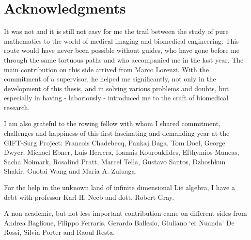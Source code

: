 
\qquad
\pagestyle{empty}
\newpage

\section*{Acknowledgments}
%


It was not and it is still not easy for me the trail between the study of pure mathematics to the world of medical imaging and biomedical engineering. This route would have never been possible without guides, who have gone before me through the same tortuous paths and who accompanied me in the last year. The main contribution on this side arrived from Marco Lorenzi. With the commitment of a supervisor, he helped me significantly, not only in the development of this thesis, and in solving various problems and doubts, but especially in having - laboriously - introduced me to the craft of biomedical research.

I am also grateful to the rowing fellow with whom I shared commitment, challenges and happiness of this first fascinating and demanding year at the GIFT-Surg Project: 
Francois Chadebecq, 
Pankaj Daga, 
Tom Doel, 
George Dwyer,
Michael Ebner,
Luis Herrera,
Ioannis Kourouklides,
Efthymios Maneas,
Sacha Noimark,
Rosalind Pratt,
Marcel Tella,
Gustavo Santos,
Dzhoshkun Shakir,
Guotai Wang and Maria A. Zuluaga.

For the help in the unknown land of infinite dimensional Lie algebra, I have a debt with professor Karl-H. Neeb and dott. Robert Gray.

A non academic, but not less important contribution came on different sides from Andrea Baglione, Filippo Ferraris, Gerardo Ballesio, Giuliano `er Nuanda' De Rossi, Silvia Porter and Raoul Resta. 

